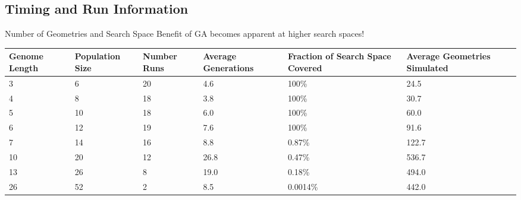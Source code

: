\subsection{Timing and Run Information}
\begin{frame}{Number of Geometries and Search Space}
Benefit of GA becomes apparent at higher search spaces!
\begin{table}
    \centering
    \tiny
    \begin{tabular}{ p{0.75cm} | p{1cm} p{1cm} p{1cm} p{1cm} p{1cm}}
      Genome Length&Population Size&Number Runs&Average Generations&Fraction of Search Space Covered&Average Geometries Simulated \\
      \hline
      \hline
      3&6&20&4.6&100\%&24.5 \\
			4&8&18&3.8&100\%&30.7 \\
			5&10&18&6.0&100\%& 60.0 \\
			6&12&19&7.6&100\%&91.6 \\
			7&14&16&8.8&0.87\%&122.7 \\
			10&20&12&26.8&0.47\%& 536.7 \\
			13&26&8&19.0&0.18\% &494.0\\
			26&52&2&8.5&0.0014\% &442.0\\
    \end{tabular}
\end{table}
\end{frame}
